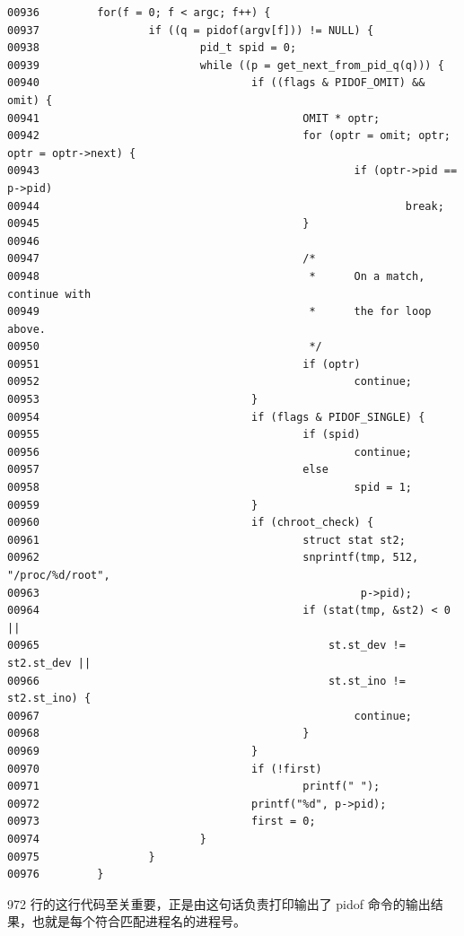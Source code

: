 {\begin{shaded}\begin{verbatim}
00936         for(f = 0; f < argc; f++) {
00937                 if ((q = pidof(argv[f])) != NULL) {
00938                         pid_t spid = 0;
00939                         while ((p = get_next_from_pid_q(q))) {
00940                                 if ((flags & PIDOF_OMIT) && omit) {
00941                                         OMIT * optr;
00942                                         for (optr = omit; optr; optr = optr->next) {
00943                                                 if (optr->pid == p->pid)
00944                                                         break;
00945                                         }
00946 
00947                                         /*
00948                                          *      On a match, continue with
00949                                          *      the for loop above.
00950                                          */
00951                                         if (optr)
00952                                                 continue;
00953                                 }
00954                                 if (flags & PIDOF_SINGLE) {
00955                                         if (spid)
00956                                                 continue;
00957                                         else
00958                                                 spid = 1;
00959                                 }
00960                                 if (chroot_check) {
00961                                         struct stat st2;
00962                                         snprintf(tmp, 512, "/proc/%d/root",
00963                                                  p->pid);
00964                                         if (stat(tmp, &st2) < 0 ||
00965                                             st.st_dev != st2.st_dev ||
00966                                             st.st_ino != st2.st_ino) {
00967                                                 continue;
00968                                         }
00969                                 }
00970                                 if (!first)
00971                                         printf(" ");
00972                                 printf("%d", p->pid);
00973                                 first = 0;
00974                         }
00975                 }
00976         }
\end{verbatim}\end{shaded}}
972 行的这行代码至关重要，正是由这句话负责打印输出了 pidof
命令的输出结果，也就是每个符合匹配进程名的进程号。

